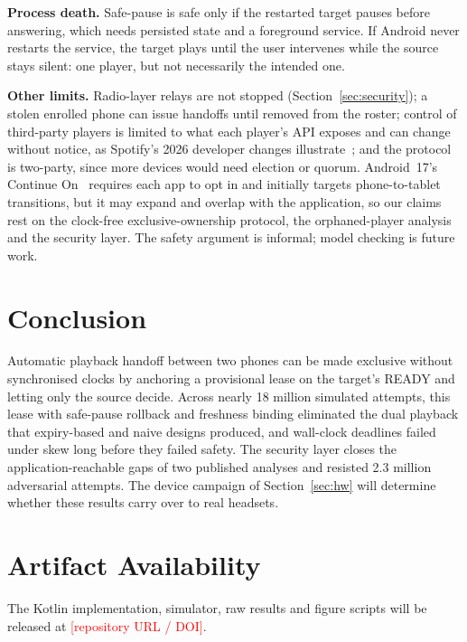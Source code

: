 \documentclass[conference]{IEEEtran}
\newcommand{\draftnote}[1]{\textcolor{red}{#1}}
\begin{document}
\textbf{Process death.} Safe-pause is safe only if the restarted target pauses before answering, which needs persisted state and a foreground service. If Android never restarts the service, the target plays until the user intervenes while the source stays silent: one player, but not necessarily the intended one.

\textbf{Other limits.} Radio-layer relays are not stopped (Section~\ref{sec:security}); a stolen enrolled phone can issue handoffs until removed from the roster; control of third-party players is limited to what each player's API exposes and can change without notice, as Spotify's 2026 developer changes illustrate~\cite{spotify2026}; and the protocol is two-party, since more devices would need election or quorum. Android~17's Continue On~\cite{android17,continueon} requires each app to opt in and initially targets phone-to-tablet transitions, but it may expand and overlap with the application, so our claims rest on the clock-free exclusive-ownership protocol, the orphaned-player analysis and the security layer. The safety argument is informal; model checking is future work.

\section{Conclusion}

Automatic playback handoff between two phones can be made exclusive without synchronised clocks by anchoring a provisional lease on the target's READY and letting only the source decide. Across nearly 18 million simulated attempts, this lease with safe-pause rollback and freshness binding eliminated the dual playback that expiry-based and naive designs produced, and wall-clock deadlines failed under skew long before they failed safety. The security layer closes the application-reachable gaps of two published analyses and resisted 2.3 million adversarial attempts. The device campaign of Section~\ref{sec:hw} will determine whether these results carry over to real headsets.

\section*{Artifact Availability}
The Kotlin implementation, simulator, raw results and figure scripts will be released at \draftnote{[repository URL / DOI]}.
\end{document}
